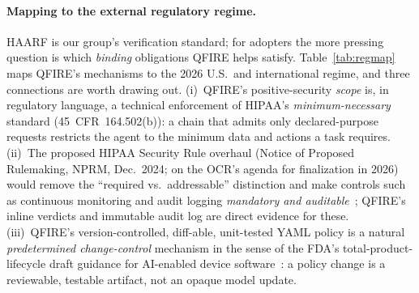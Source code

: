 \documentclass[11pt]{article}
\newcommand{\rev}[1]{#1}
\begin{document}
\paragraph{\rev{Mapping to the external regulatory regime.}}
\rev{HAARF is our group's verification standard; for adopters the more pressing
question is which \emph{binding} obligations QFIRE helps satisfy.
Table~\ref{tab:regmap} maps QFIRE's mechanisms to the 2026 U.S.\ and international
regime, and three connections are worth drawing out. (i)~QFIRE's
positive-security \emph{scope} is, in regulatory language, a technical
enforcement of HIPAA's \emph{minimum-necessary} standard (45~CFR~164.502(b)): a
chain that admits only declared-purpose requests restricts the agent to the
minimum data and actions a task requires. (ii)~The proposed HIPAA Security Rule
overhaul (Notice of Proposed Rulemaking, NPRM, Dec.\ 2024; on the OCR's agenda for finalization in 2026) would
remove the ``required vs.\ addressable'' distinction and make controls such as
continuous monitoring and audit logging \emph{mandatory and
auditable}~\cite{hipaa_nprm2025}; QFIRE's inline verdicts and immutable audit log
are direct evidence for these. (iii)~QFIRE's version-controlled, diff-able,
unit-tested YAML policy is a natural \emph{predetermined change-control}
mechanism in the sense of the FDA's total-product-lifecycle draft guidance for
AI-enabled device software~\cite{fda_aielifecycle2025}: a policy change is a
reviewable, testable artifact, not an opaque model update.}
\end{document}
